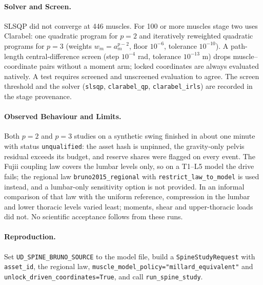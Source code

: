 \paragraph{Solver and Screen.}
SLSQP did not converge at 446 muscles. For 100 or more muscles stage two uses
Clarabel: one quadratic program for $p=2$ and iteratively reweighted quadratic
programs for $p=3$ (weights $w_m=a_m^{p-2}$, floor $10^{-6}$, tolerance
$10^{-10}$). A path-length central-difference screen (step $10^{-4}$ rad,
tolerance $10^{-13}$ m) drops muscle--coordinate pairs without a moment arm;
locked coordinates are always evaluated natively. A test requires screened and
unscreened evaluation to agree. The screen threshold and the solver
(\texttt{slsqp}, \texttt{clarabel\_qp}, \texttt{clarabel\_irls}) are recorded
in the stage provenance.

\paragraph{Observed Behaviour and Limits.}
Both $p=2$ and $p=3$ studies on a synthetic swing finished in about one
minute with status \texttt{unqualified}: the asset hash is unpinned, the
gravity-only pelvis residual exceeds its budget, and reserve shares were
flagged on every event. The Fujii coupling law covers the lumbar levels only,
so on a T1--L5 model the drive fails; the regional law
\texttt{bruno2015\_regional} with \texttt{restrict\_law\_to\_model} is used
instead, and a lumbar-only sensitivity option is not provided. In an informal
comparison of that law with the uniform reference, compression in the lumbar
and lower thoracic levels varied least; moments, shear and upper-thoracic
loads did not. No scientific acceptance follows from these runs.

\paragraph{Reproduction.}
Set \texttt{UD\_SPINE\_BRUNO\_SOURCE} to the model file, build a
\texttt{SpineStudyRequest} with \texttt{asset\_id}, the regional law,
\texttt{muscle\_model\_policy="millard\_equivalent"} and
\texttt{unlock\_driven\_coordinates=True}, and call \texttt{run\_spine\_study}.
